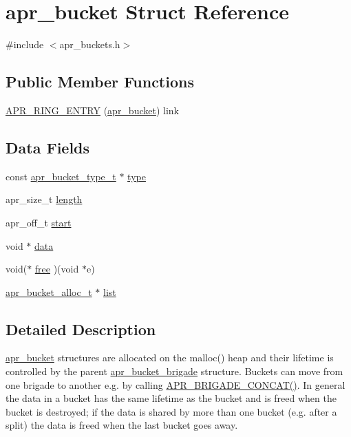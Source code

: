 \hypertarget{structapr__bucket}{\section{apr\-\_\-bucket Struct Reference}
\label{structapr__bucket}
}


{\ttfamily \#include $<$apr\-\_\-buckets.\-h$>$}

\subsection*{Public Member Functions}
\begin{DoxyCompactItemize}
\item 
\hyperlink{structapr__bucket_ab1acff965e57e067dfde80321d04dea7}{A\-P\-R\-\_\-\-R\-I\-N\-G\-\_\-\-E\-N\-T\-R\-Y} (\hyperlink{structapr__bucket}{apr\-\_\-bucket}) link
\end{DoxyCompactItemize}
\subsection*{Data Fields}
\begin{DoxyCompactItemize}
\item 
const \hyperlink{structapr__bucket__type__t}{apr\-\_\-bucket\-\_\-type\-\_\-t} $\ast$ \hyperlink{structapr__bucket_ac27fa5ce798e688ad243ebe1615937fc}{type}
\item 
apr\-\_\-size\-\_\-t \hyperlink{structapr__bucket_a0898dfc78d9275187189b9a745e619bf}{length}
\item 
apr\-\_\-off\-\_\-t \hyperlink{structapr__bucket_a4a8791b606b3ad613b8672ec94145628}{start}
\item 
void $\ast$ \hyperlink{structapr__bucket_a7fc4604750889b3f762bda1a786d276a}{data}
\item 
void($\ast$ \hyperlink{structapr__bucket_ac50b1c1de2b171938c33bf3ac478f359}{free} )(void $\ast$e)
\item 
\hyperlink{group___a_p_r___util___bucket___brigades_ga9a30babfeb6e290db124d8f9b69e49e4}{apr\-\_\-bucket\-\_\-alloc\-\_\-t} $\ast$ \hyperlink{structapr__bucket_a5a500b80105834621514d6c0814d0966}{list}
\end{DoxyCompactItemize}


\subsection{Detailed Description}
\hyperlink{structapr__bucket}{apr\-\_\-bucket} structures are allocated on the malloc() heap and their lifetime is controlled by the parent \hyperlink{structapr__bucket__brigade}{apr\-\_\-bucket\-\_\-brigade} structure. Buckets can move from one brigade to another e.\-g. by calling \hyperlink{group___a_p_r___util___bucket___brigades_ga7cecbc89be912ce9ab24c889eb8f955b}{A\-P\-R\-\_\-\-B\-R\-I\-G\-A\-D\-E\-\_\-\-C\-O\-N\-C\-A\-T()}. In general the data in a bucket has the same lifetime as the bucket and is freed when the bucket is destroyed; if the data is shared by more than one bucket (e.\-g. after a split) the data is freed when the last bucket goes away. 

